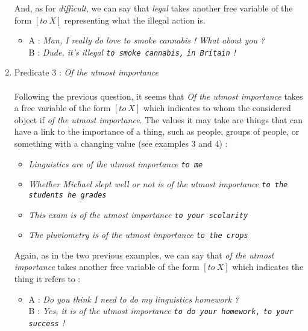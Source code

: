 \documentclass{article}
\begin{document}
\begin{enumerate}
    And, as for \textsl{difficult}, we can say that \textsl{legal} takes another free variable of the form $\left[to \  X\right]$ representing what the illegal action is. 
    \begin{itemize}
        \item A : \textsl{Man, I really do love to smoke cannabis ! What about you ?}\\
        B : \textsl{Dude, it's illegal \texttt{to smoke cannabis,} \texttt{in Britain} !}
    \end{itemize}

\item Predicate 3 : \textsl{Of the utmost importance} \\\\
    Following the previous question, it seems that \textsl{Of the utmost importance} takes a free variable of the form $\left[to \ X\right]$ which indicates to whom the considered object if \textsl{of the utmost importance}. The values it may take are things that can have a link to the importance of a thing, such as people, groups of people, or something with a changing value (see examples 3 and 4) :
    \begin{itemize}
        \item \textsl{Linguistics are of the utmost importance \texttt{to me}}
        \item \textsl{Whether Michael slept well or not is of the utmost importance \texttt{to the students he grades}}
        \item \textsl{This exam is of the utmost importance \texttt{to your scolarity}}
        \item \textsl{The pluviometry is of the utmost importance \texttt{to the crops}}
    \end{itemize}

    Again, as in the two previous examples, we can say that \textsl{of the utmost importance} takes another free variable of the form $\left[to \ X\right]$ which indicates the thing it refers to : 
    \begin{itemize}
        \item A : \textsl{Do you think I need to do my linguistics homework ?}\\
        B : \textsl{Yes, it is of the utmost importance \texttt{to do your homework,} \texttt{to your success} !}
    \end{itemize}


\end{enumerate}
\end{document}
